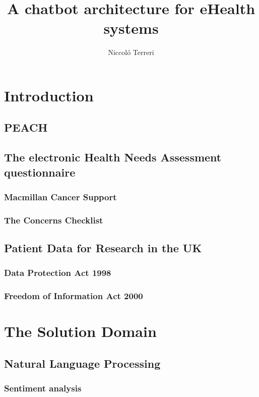 \documentclass[12pt, twoside, a4paper, draft]{report}
\author{Niccol\'o Terreri}
\title{A chatbot architecture for eHealth systems}
\begin{document}
\maketitle
\tableofcontents

\chapter{Introduction}
\section{PEACH}
\section{The electronic Health Needs Assessment questionnaire}
\subsection{Macmillan Cancer Support}
\subsection{The Concerns Checklist}
\section{Patient Data for Research in the UK}
\subsection{Data Protection Act 1998}
\subsection{Freedom of Information Act 2000}

\chapter{The Solution Domain}
\section{Natural Language Processing}
\subsection{Sentiment analysis}
\end{document}
